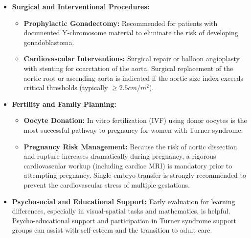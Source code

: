 \begin{itemize}
\begin{itemize}
    \end{itemize}
    \item \textbf{Surgical and Interventional Procedures:}
    \begin{itemize}
        \item \textbf{Prophylactic Gonadectomy:} Recommended for patients with documented Y-chromosome material to eliminate the risk of developing gonadoblastoma.
        \item \textbf{Cardiovascular Interventions:} Surgical repair or balloon angioplasty with stenting for coarctation of the aorta. Surgical replacement of the aortic root or ascending aorta is indicated if the aortic size index exceeds critical thresholds (typically $\ge 2.5 cm/m^2$).
    \end{itemize}
    \item \textbf{Fertility and Family Planning:}
    \begin{itemize}
        \item \textbf{Oocyte Donation:} In vitro fertilization (IVF) using donor oocytes is the most successful pathway to pregnancy for women with Turner syndrome.
        \item \textbf{Pregnancy Risk Management:} Because the risk of aortic dissection and rupture increases dramatically during pregnancy, a rigorous cardiovascular workup (including cardiac MRI) is mandatory prior to attempting pregnancy. Single-embryo transfer is strongly recommended to prevent the cardiovascular stress of multiple gestations.
    \end{itemize}
    \item \textbf{Psychosocial and Educational Support:} Early evaluation for learning differences, especially in visual-spatial tasks and mathematics, is helpful. Psycho-educational support and participation in Turner syndrome support groups can assist with self-esteem and the transition to adult care.
\end{itemize}

